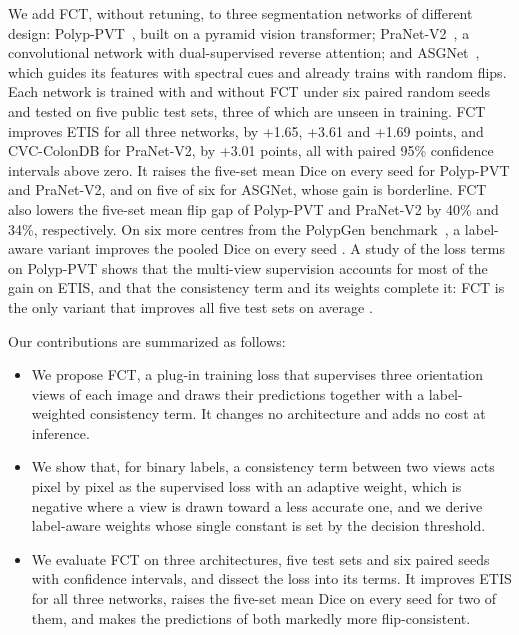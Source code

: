 We add FCT, without retuning, to three segmentation networks of different design:
Polyp-PVT~\cite{dong2023polyppvt}, built on a pyramid vision transformer;
PraNet-V2~\cite{hu2026pranetv2}, a convolutional network with dual-supervised reverse attention;
and ASGNet~\cite{sun2026asgnet}, which guides its features with spectral cues and already trains
with random flips. Each network is trained with and without FCT under six paired random seeds and
tested on five public test sets, three of which are unseen in training. FCT improves ETIS for all
three networks, by +1.65, +3.61 and +1.69 points, and \mbox{CVC-ColonDB} for PraNet-V2, by +3.01
points, all with paired 95\% confidence intervals above zero. It raises the five-set mean Dice on
every seed for Polyp-PVT and PraNet-V2, and on five of six for ASGNet, whose gain is borderline. FCT
also lowers the five-set mean flip gap of Polyp-PVT and PraNet-V2 by 40\% and 34\%, respectively. On
six more centres from the PolypGen benchmark~\cite{ali2023polypgen}, a label-aware variant improves
the pooled Dice on every seed . A study of the loss terms on Polyp-PVT
shows that the multi-view supervision accounts for most of the gain on ETIS, and that the consistency
term and its weights complete it: FCT is the only variant that improves all five test sets on
average .

Our contributions are summarized as follows:
\begin{itemize}
\item We propose FCT, a plug-in training loss that supervises three orientation views of each image
and draws their predictions together with a label-weighted consistency term. It changes no
architecture and adds no cost at inference.
\item We show that, for binary labels, a consistency term between two views acts pixel by pixel as
the supervised loss with an adaptive weight, which is negative where a view is drawn toward a less
accurate one, and we derive label-aware weights whose single constant is set by the decision
threshold.
\item We evaluate FCT on three architectures, five test sets and six paired seeds with confidence
intervals, and dissect the loss into its terms. It improves ETIS for all three networks, raises the
five-set mean Dice on every seed for two of them, and makes the predictions of both markedly more
flip-consistent.
\end{itemize}
